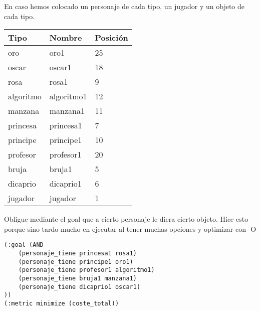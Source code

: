\documentclass[]{article}
\begin{document}
En caso hemos colocado un personaje de cada tipo, un jugador y un objeto de cada tipo.

\begin{table}[htbp]
	\begin{center}
		\begin{tabular}{|l|l|l|}
			\hline
			Tipo & Nombre & Posición \\
			\hline \hline
			oro & oro1 & 25 \\ \hline
			oscar & oscar1 & 18\\ \hline
			rosa & rosa1 & 9\\ \hline
			algoritmo & algoritmo1 & 12 \\ \hline
			manzana & manzana1 & 11\\ \hline
			princesa & princesa1 & 7 \\ \hline
			principe & principe1 & 10 \\ \hline
			profesor & profesor1 & 20  \\ \hline
			bruja & bruja1 & 5 \\ \hline
			dicaprio  & dicaprio1& 6 \\ \hline
			jugador & jugador & 1 \\ \hline
			
		\end{tabular}
	\end{center}
\end{table}

Obligue mediante el goal que a cierto personaje le diera cierto objeto. Hice esto porque sino tardo mucho en ejecutar al tener muchas opciones y optimizar con -O
\newpage
\begin{lstlisting}
(:goal (AND
	(personaje_tiene princesa1 rosa1)
	(personaje_tiene principe1 oro1)
	(personaje_tiene profesor1 algoritmo1)
	(personaje_tiene bruja1 manzana1)
	(personaje_tiene dicaprio1 oscar1)
))
(:metric minimize (coste_total))
\end{lstlisting}
\end{document}

